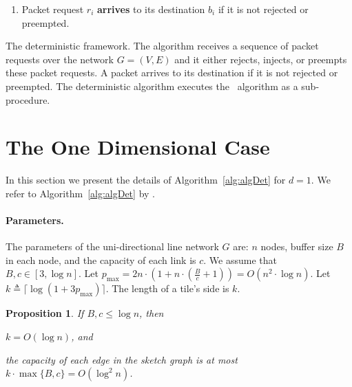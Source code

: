 \documentclass[11pt]{article}
\newtheorem{proposition}[theorem]{Proposition}
\newcommand{\route}{\text{\sc{ipp}}}
\newcommand{\IPP}{\route}
\newcommand{\pmax}{p_{\max}}
\newcommand{\eqdf}{\triangleq}
\newcommand{\alg}{\text{\sc{alg}}}
\newenvironment{proof sketch}[1]{\noindent {\emph{Proof sketch of #1:}}}{\hfill \qed}
\begin{document}
\begin{algorithm}[H]
\begin{enumerate}
\begin{comment}
                  \item Perform detailed routing in the \emph{last segment} of $\hat p_i$. If the detailed routing in this segment fails then \textbf{preempt} $r_i$.
                  \item Perform detailed routing in the \emph{last tile} of $\hat p_i$. If the detailed routing in this segment fails then \textbf{preempt} $r_i$.
                \end{enumerate}
\end{comment}
            \item Packet request $r_i$ \textbf{arrives} to its destination $b_i$ if it is not rejected or preempted.
        \end{enumerate}
\caption{The deterministic framework. The algorithm receives a sequence of packet requests over the network $G=(V,E)$ and it either rejects, injects, or preempts these packet requests. A packet arrives to its destination if it is not rejected or preempted. The deterministic algorithm executes the \IPP\ algorithm as a sub-procedure.}\label{alg:algDet}
\end{algorithm}

\section{The One Dimensional Case}\label{sec:alg}
In this section we present the details of Algorithm~\ref{alg:algDet} for $d=1$.
We refer to Algorithm~\ref{alg:algDet} by \alg.

\paragraph{Parameters.}The parameters of the uni-directional line network $G$ are:
$n$ nodes, buffer size $B$ in each node, and the capacity
of each link is $c$. We assume that $B,c\in [3,\log n]$.
Let $\pmax=2n  \cdot \left(1+n \cdot
\left(\frac{B}{c}+1\right)\right) = O(n^2\cdot \log n)$.
Let $k\eqdf \lceil \log (1+3\pmax) \rceil$. The length of a
tile's side is $k$.

\begin{proposition}\label{prop:tiling}
If $B,c\leq \log n$, then
\begin{inparaenum}[(i)]
\item$k=O(\log n)$, and
\item the capacity of each edge in the sketch graph is at most
  $k\cdot \max\{B,c\} = O(\log^2 n)$.
\end{inparaenum}
\end{proposition}
\end{document}
